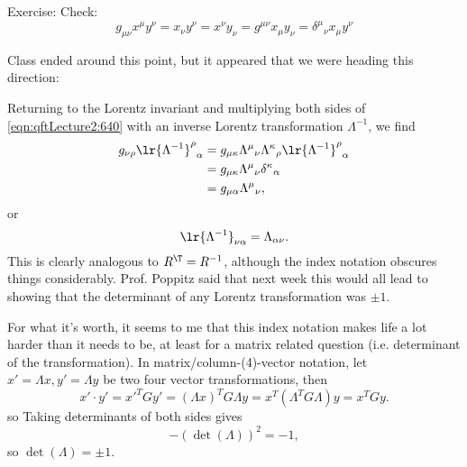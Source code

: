 Exercise: Check:
\begin{equation}\label{eqn:qftLecture2:740}
g_{\mu\nu} x^\mu y^\nu = x_\nu y^\nu = x^\nu y_\nu
= g^{\mu\nu} x_\mu y_\nu = {\delta^\mu}_\nu x_\mu y^\nu
\end{equation}

Class ended around this point, but it appeared that we were heading this direction:

Returning to the Lorentz invariant and multiplying both sides of
\cref{eqn:qftLecture2:640} with an inverse Lorentz transformation \( \Lambda^{-1} \), we find
\begin{equation}\label{eqn:qftLecture2:760}
\begin{aligned}
g_{\nu\rho}
{\lr{\Lambda^{-1}}^\rho}_\alpha
&=
g_{\mu \kappa}
{\Lambda^\mu}_\nu
{\Lambda^\kappa}_\rho
{\lr{\Lambda^{-1}}^\rho}_\alpha \\
&=
g_{\mu \kappa}
{\Lambda^\mu}_\nu
{\delta^\kappa}_\alpha \\
&=
g_{\mu \alpha}
{\Lambda^\mu}_\nu,
\end{aligned}
\end{equation}
or
\begin{equation}\label{eqn:qftLecture2:780}
\lr{\Lambda^{-1}}_{\nu \alpha} = \Lambda_{\alpha \nu}.
\end{equation}
This is clearly analogous to \( R^\T = R^{-1} \), although the index notation obscures things considerably.  Prof. Poppitz said that next week this would all lead to showing that the determinant of any Lorentz transformation was \( \pm 1 \).

For what it's worth, it seems to me that this index notation makes life a lot harder than it needs to be, at least for a matrix related question (i.e. determinant of the transformation).  In matrix/column-(4)-vector notation, let \(x' = \Lambda x, y' = \Lambda y\) be two four vector transformations, then
\begin{equation}\label{eqn:qftLecture2:800}
x' \cdot y' = {x'}^T G y' = (\Lambda x)^T G \Lambda y = x^T ( \Lambda^T G \Lambda) y = x^T G y.
\end{equation}
so
Taking determinants of both sides gives
\begin{equation}\label{eqn:qftLecture2LorentzTransformation:n}
-(\det(\Lambda))^2 = -1,
\end{equation}
so \(\det(\Lambda) = \pm 1\).
